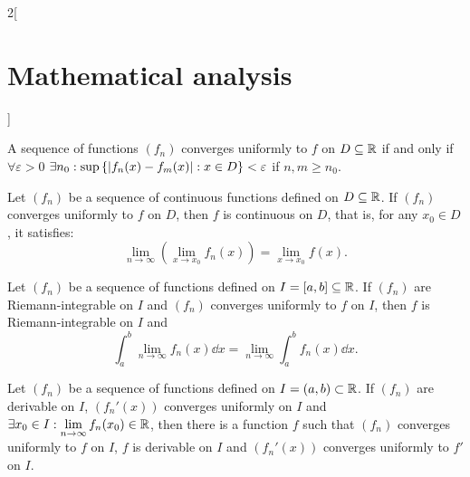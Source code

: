 \documentclass[../../../main.tex]{subfiles}
\begin{document}
\begin{multicols}{2}[\section{Mathematical analysis}]
\begin{theorem}
A sequence of functions $(f_n)$ converges uniformly to $f$ on $D\subseteq\mathbb{R} $ if and only if $\forall\varepsilon>0$ $\displaystyle\exists n_0:\sup\left\{|f_n(x)-f_m(x)|:\\ x\in D\right\}< \varepsilon$ if $n,m\geq n_0$.
\end{theorem}
\begin{theorem}
Let $(f_n)$ be a sequence of continuous functions defined on $D\subseteq\mathbb{R} $. If $(f_n)$ converges uniformly to $f$ on $D$, then $f$ is continuous on $D$, that is, for any $x_0\in D$, it satisfies: $$\lim_{n\to\infty}\left(\lim_{x\to x_0} f_n(x)\right)=\lim_{x\to x_0} f(x).$$
\end{theorem}
\begin{theorem}
Let $(f_n)$ be a sequence of functions defined on  $I=[a,b]\subseteq\mathbb{R} $. If $(f_n)$ are Riemann-integrable on $I$ and $(f_n)$ converges uniformly to $f$ on $I$, then $f$ is Riemann-integrable on $I$ and $$\int_a^b\lim_{n\to\infty} f_n(x) \dd x=\lim_{n\to\infty} \int_a^bf_n(x) \dd x.$$
\end{theorem}
\begin{theorem}
Let $(f_n)$ be a sequence of functions defined on $I=(a,b)\subset\mathbb{R} $. If $(f_n)$ are derivable on $I$, $(f_n'(x))$ converges uniformly on $I$ and $\displaystyle\exists x_0\in I: \lim_{n\to\infty}f_n(x_0)\in\mathbb{R} $, then there is a function $f$ such that $(f_n)$ converges uniformly to $f$ on $I$, $f$ is derivable on $I$ and $(f_n'(x))$ converges uniformly to $f'$ on $I$.
\end{theorem}

\end{multicols}
\end{document}

